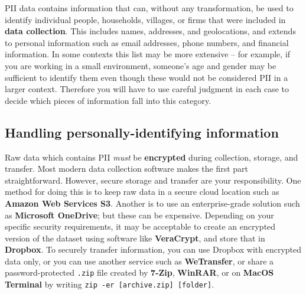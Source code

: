PII data contains information that can, without any transformation, be used to identify
individual people, households, villages, or firms that were included in \textbf{data collection}.
This includes names, addresses, and geolocations, and extends to personal information
such as email addresses, phone numbers, and financial information.
In some contexts this list may be more extensive --
for example, if you are working in a small environment,
someone's age and gender may be sufficient to identify them
even though these would not be considered PII in a larger context.
Therefore you will have to use careful judgment in each case
to decide which pieces of information fall into this category.

\subsection{Handling personally-identifying information}

Raw data which contains PII \textit{must} be \textbf{encrypted}
during collection, storage, and transfer.
Most modern data collection software makes the first part straightforward.
However, secure storage and transfer are your responsibility.
One method for doing this is to keep raw data in a secure cloud location such as \textbf{Amazon Web Services S3}.
Another is to use an enterprise-grade solution such as \textbf{Microsoft OneDrive}; but these can be expensive.
Depending on your specific security requirements,
it may be acceptable to create an encrypted version of the dataset
using software like \textbf{VeraCrypt}, and store that in \textbf{Dropbox}.
To securely transfer information,
you can use Dropbox with encrypted data only,
or you can use another service such as \textbf{WeTransfer},
or share a password-protected \texttt{.zip} file created by \textbf{7-Zip},
\textbf{WinRAR},
or on \textbf{MacOS Terminal} by writing \texttt{zip -er [archive.zip] [folder]}.

